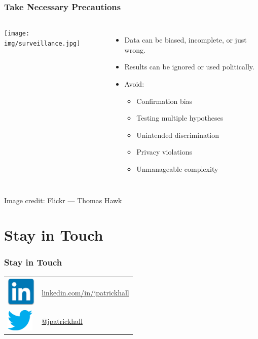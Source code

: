 \documentclass[11pt,
               aspectratio=169
               ]{beamer}
\begin{document}
		\begin{frame}
		
			\frametitle{Take Necessary Precautions}	
		
				\begin{columns}
					
						\centering
						\texttt{[image: img/surveillance.jpg]}
					
					\begin{itemize}
						\item Data can be biased, incomplete, or just wrong.
						\item Results can be ignored or used politically.
						\item Avoid:
							\begin{itemize} 
								\item Confirmation bias 
								\item Testing multiple hypotheses   
								\item Unintended discrimination 
								\item Privacy violations
								\item Unmanageable complexity
							\end{itemize}
					\end{itemize}				
						
				\end{columns} 

				\vspace{10pt}

				\tiny Image credit: Flickr --- Thomas Hawk

		\end{frame}

	\section*{Stay in Touch}
	
		\begin{frame}
		
			\frametitle{Stay in Touch}
			
			\begin{tabular}{m{1.5cm} m{8cm}}
				\includegraphics[height=40pt]{img/li.jpg} \newline &  
 				\href{https://www.linkedin.com/in/jpatrickhall}{linkedin.com/in/jpatrickhall} \newline \\
 				\includegraphics[height=30pt]{img/twitter.png} &
 				\href{https://twitter.com/jpatrickhall}{@jpatrickhall}
			\end{tabular}

		\end{frame}
\end{document}
